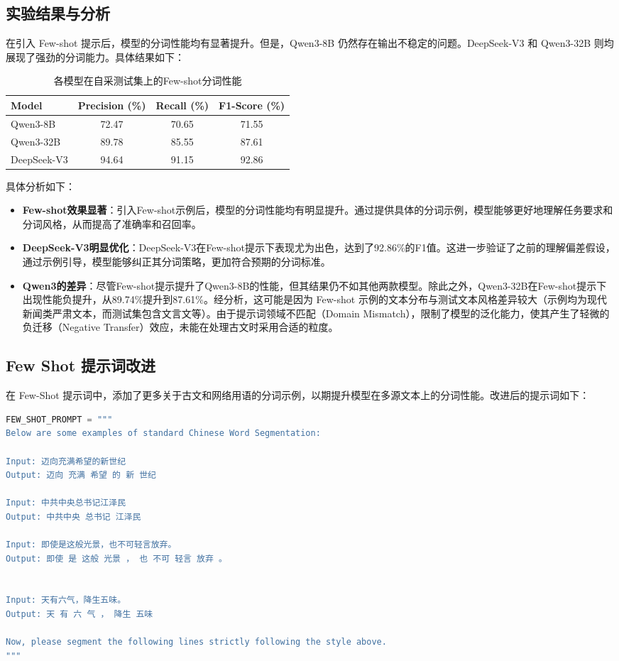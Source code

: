 \documentclass[11pt]{article}
\begin{document}
\subsection{实验结果与分析}
在引入 Few-shot 提示后，模型的分词性能均有显著提升。但是，Qwen3-8B 仍然存在输出不稳定的问题。DeepSeek-V3 和 Qwen3-32B 则均展现了强劲的分词能力。具体结果如下：
\begin{table}[H]
    \centering
    \caption{各模型在自采测试集上的Few-shot分词性能}
    \label{tab:few_shot_result}
    \begin{tabular}{l c c c}
        \toprule
        \textbf{Model} & \textbf{Precision (\%)} & \textbf{Recall (\%)} & \textbf{F1-Score (\%)} \\
        \midrule
        Qwen3-8B      & 72.47 & 70.65 & 71.55 \\
        Qwen3-32B     & 89.78 & 85.55 & 87.61 \\
        DeepSeek-V3   & 94.64 & 91.15 & 92.86 \\
        \bottomrule
    \end{tabular}
\end{table}
具体分析如下：
\begin{itemize}
    \item \textbf{Few-shot效果显著}：引入Few-shot示例后，模型的分词性能均有明显提升。通过提供具体的分词示例，模型能够更好地理解任务要求和分词风格，从而提高了准确率和召回率。
    \item \textbf{DeepSeek-V3明显优化}：DeepSeek-V3在Few-shot提示下表现尤为出色，达到了92.86\%的F1值。这进一步验证了之前的理解偏差假设，通过示例引导，模型能够纠正其分词策略，更加符合预期的分词标准。
    \item \textbf{Qwen3的差异}：尽管Few-shot提示提升了Qwen3-8B的性能，但其结果仍不如其他两款模型。除此之外，Qwen3-32B在Few-shot提示下出现性能负提升，从89.74\%提升到87.61\%。经分析，这可能是因为 Few-shot 示例的文本分布与测试文本风格差异较大（示例均为现代新闻类严肃文本，而测试集包含文言文等）。由于提示词领域不匹配（Domain Mismatch），限制了模型的泛化能力，使其产生了轻微的负迁移（Negative Transfer）效应，未能在处理古文时采用合适的粒度。
\end{itemize}
\subsection{Few Shot 提示词改进}
在 Few-Shot 提示词中，添加了更多关于古文和网络用语的分词示例，以期提升模型在多源文本上的分词性能。改进后的提示词如下：
\begin{lstlisting}[language=Python]
FEW_SHOT_PROMPT = """
Below are some examples of standard Chinese Word Segmentation:

Input: 迈向充满希望的新世纪
Output: 迈向 充满 希望 的 新 世纪

Input: 中共中央总书记江泽民
Output: 中共中央 总书记 江泽民

Input: 即使是这般光景，也不可轻言放弃。
Output: 即使 是 这般 光景 ， 也 不可 轻言 放弃 。


Input: 天有六气，降生五味。
Output: 天 有 六 气 ， 降生 五味

Now, please segment the following lines strictly following the style above.
"""
\end{lstlisting}
\end{document}
